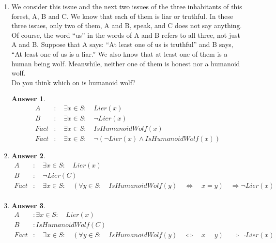 \documentclass[a4paper]{article}
\renewcommand{\(}{\left(}
\renewcommand{\)}{\right)}
\theoremstyle{plain}
\theoremstyle{plain}
\theoremstyle{definition}
\newtheorem*{answer}{Answer}
\begin{document}
\begin{enumerate}[label*=\alph*.,ref=\alph*]
\item We consider this issue and the next two issues of the three inhabitants of this forest, A, B and C. We know that each of them is liar or truthful. In these three issues, only two of them, A and B, speak, and C does not say anything. Of course, the word ``us'' in the words of A and B refers to all three, not just A and B. Suppose that A says: ``At least one of us is truthful'' and B says, ``At least one of us is a liar.'' We also know that at least one of them is a human being wolf. Meanwhile, neither one of them is honest nor a humanoid wolf. \\
Do you think which on is humanoid wolf?
\begin{shaded}
\begin{answer}
\begin{align*}
  A  &: \quad \exists x \in S : \quad Lier(x) \\
  B &: \quad \exists x \in S : \quad \neg Lier(x) \\
  Fact &: \quad \exists x \in S : \quad IsHumanoidWolf(x) \\
  Fact &: \quad \exists x \in S : \quad \neg (\neg Lier(x) \wedge IsHumanoidWolf(x))
\end{align*}
\end{answer}
\end{shaded}

\item \quad
\begin{shaded}
\begin{answer}
\begin{align*}
  A &: \quad \exists x \in S : \quad Lier(x) \\
  B &: \quad \neg Lier(C) \\
  Fact &: \quad \exists x \in S : \quad (\forall y \in S : \quad IsHumanoidWolf(y) \quad \Leftrightarrow \quad x = y) \quad \Rightarrow \neg Lier(x) \\
\end{align*}
\end{answer}
\end{shaded}

\item \quad
\begin{shaded}
\begin{answer}
\begin{align*}
 A &:  \exists x \in S : \quad Lier(x) \\
 B &: IsHumanoidWolf(C) \\
  Fact &: \quad \exists x \in S : \quad (\forall y \in S : \quad IsHumanoidWolf(y) \quad \Leftrightarrow \quad x = y) \quad \Rightarrow \neg Lier(x) \\
\end{align*}
\end{answer}
\end{shaded}


\end{enumerate}
\end{document}
